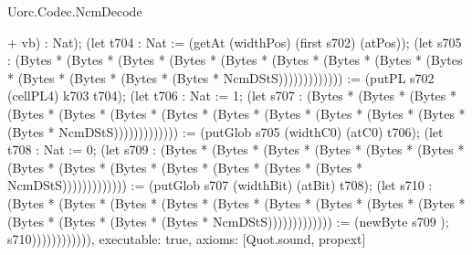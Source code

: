 \begin{lexlean}{Uorc.Codec.NcmDecode}
\begin{semanticmodule}
{+ vb) : Nat); (let t704 : Nat := (getAt (widthPos) (first s702) (atPos)); (let s705 : (Bytes * (Bytes * (Bytes * (Bytes * (Bytes * (Bytes * (Bytes * (Bytes * (Bytes * (Bytes * (Bytes * (Bytes * (Bytes * NcmDStS))))))))))))) := (putPL s702 (cellPL4) k703 t704); (let t706 : Nat := 1; (let s707 : (Bytes * (Bytes * (Bytes * (Bytes * (Bytes * (Bytes * (Bytes * (Bytes * (Bytes * (Bytes * (Bytes * (Bytes * (Bytes * NcmDStS))))))))))))) := (putGlob s705 (widthC0) (atC0) t706); (let t708 : Nat := 0; (let s709 : (Bytes * (Bytes * (Bytes * (Bytes * (Bytes * (Bytes * (Bytes * (Bytes * (Bytes * (Bytes * (Bytes * (Bytes * (Bytes * NcmDStS))))))))))))) := (putGlob s707 (widthBit) (atBit) t708); (let s710 : (Bytes * (Bytes * (Bytes * (Bytes * (Bytes * (Bytes * (Bytes * (Bytes * (Bytes * (Bytes * (Bytes * (Bytes * (Bytes * NcmDStS))))))))))))) := (newByte s709 ); s710)))))))))))),
  executable: true,
  axioms: [Quot.sound, propext]
}


\end{semanticmodule}
\end{lexlean}
